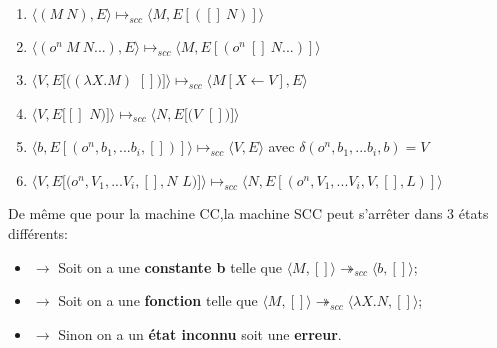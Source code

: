 \documentclass[10pt,a4paper]{report}
\begin{document}
\begin{enumerate}
\item $\langle(M~N),E\rangle \longmapsto_{scc} \langle M,E[([]~N)]\rangle$
  
\item $\langle(o^{n}~M~N...),E\rangle \longmapsto_{scc} \langle M,E[(o^{n}~[]~N...)]\rangle$
  
\item $\langle V,E[((\lambda X.M)$ $[])]\rangle \longmapsto_{scc} \langle M[X\leftarrow V],E\rangle$
  
\item $\langle V,E[[]$ $N)]\rangle \longmapsto_{scc} \langle N,E[(V$ $[])]\rangle$
  
\item $\langle b,E[(o^{n},b_{1},...b_{i},[])]\rangle \longmapsto_{scc} \langle V,E\rangle$ avec $\delta
  (o^{n},b_{1},...b_{i},b)=V$ 
  
\item $\langle V,E[(o^{n},V_{1},...V_{i},[],N$ $L)]\rangle \longmapsto_{scc} \langle N,E[(o^{n},V_{1},...V_{i},V,[],L)]\rangle$
\end{enumerate}
\bigbreak


De même que pour la machine CC,la machine SCC peut s'arrêter dans 3 états différents:
\begin{itemize}
\item[]$\longrightarrow$ Soit on a une \textbf{constante b} telle que $\langle M,[]\rangle \twoheadrightarrow_{scc} \langle b,[]\rangle$;
\item[]$\longrightarrow$ Soit on a une \textbf{fonction} telle que $\langle M,[]\rangle \twoheadrightarrow_{scc} \langle\lambda X.N,[]\rangle$;
\item[]$\longrightarrow$ Sinon on a un \textbf{état inconnu} soit une \textbf{erreur}.
\end{itemize}
\bigbreak
\end{document}
